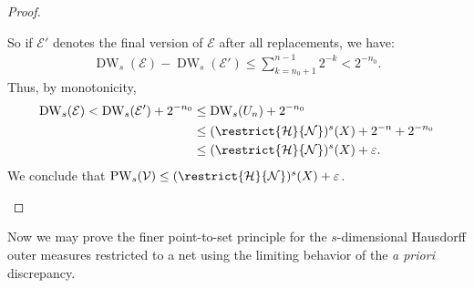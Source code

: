 \begin{proof}
\begin{enumerate}[label = (\roman*)]
            So if $\mathcal{E}'$ denotes the final version of $\mathcal{E}$ after all replacements, we have:
            \begin{align*}
                \operatorname{DW}_s(\mathcal{E}) - \operatorname{DW}_s(\mathcal{E}') \leq \sum_{k = n_0 + 1}^{n - 1} 2^{-k} < 2^{-n_0}.
            \end{align*}
            Thus, by monotonicity,
            \begin{align*}
                \operatorname{DW}_s(\mathcal{E}) < \operatorname{DW}_s(\mathcal{E}') + 2^{- n_0} &\leq \operatorname{DW}_s(U_n) + 2^{- n_0}\\
                &\leq (\restrict{\mathcal{H}}{\mathcal{N}})^s(X) + 2^{-n} + 2^{- n_0}\\
                &\leq (\restrict{\mathcal{H}}{\mathcal{N}})^s(X) + \varepsilon.
            \end{align*}
            We conclude that $\operatorname{PW}_s(\mathcal{V}) \leq (\restrict{\mathcal{H}}{\mathcal{N}})^s(X) + \varepsilon$.
    \end{enumerate}
\end{proof}

Now we may prove the finer point-to-set principle for the $s$-dimensional Hausdorff outer measures restricted to a net using the limiting behavior of the \textit{a priori} discrepancy.


